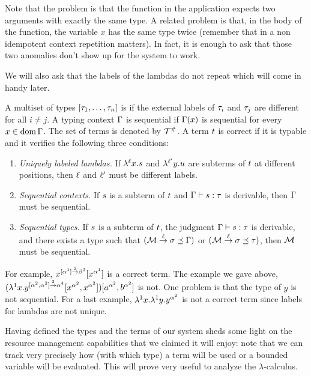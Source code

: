Note that the problem is that the function in the application expects two arguments
with exactly the same type. A related problem is that, in the body of the function,
the variable $x$ has the same type twice (remember that in a non idempotent context repetition matters).
In fact, it is enough to ask that those two anomalies don't show up for the system to work.

We will also ask that the labels of the lambdas do not repeat which
will come in handy later.

\begin{definition}
A multiset of types $[\tau_1,\hdots,\tau_n]$ is 
if the external labels of $\tau_i$ and $\tau_j$ are different for all $i \neq j$.
A typing context $\Gamma$ is sequential if $\Gamma(x)$ is sequential for every $x \in \operatorname{dom}\Gamma$.
The set of  terms is denoted by $\mathcal{T}^{\mathtt{\#}}$.
A term $t$ is correct if it is typable and it verifies the following three conditions:
\begin{enumerate}
\item {\em Uniquely labeled lambdas.}
  If $\lambda^{\ell} x. s$ and $\lambda^{\ell'} y. u$ 
  are subterms of $t$ at different positions, then $\ell$ and $\ell'$
  must be different labels.
\item {\em Sequential contexts.}
  If $s$ is a subterm of $t$ and $\Gamma \vdash s : \tau$
  is derivable, then $\Gamma$ must be sequential.
\item {\em Sequential types.}
  If $s$ is a subterm of $t$,
  the judgment $\Gamma \vdash s : \tau$ is derivable,
  and there exists a type such that
  $(\mathcal{M} \overset{\ell}{\to} \sigma \preceq \Gamma)$ or $(\mathcal{M} \overset{\ell}{\to} \sigma \preceq \tau)$,
  then $\mathcal{M}$ must be sequential.
\end{enumerate}
\end{definition}

For example,
$x^{[\alpha^1] \overset{2}{\to} \beta^3}[x^{\alpha^1}]$ is a correct term.
The example we gave above,
$(\lambda^{1} x. y^{[\alpha^2, \alpha^2] \overset{3}{\to} \alpha^4} [x^{\alpha^2}, x^{\alpha^2}])
[a^{\alpha^2}, b^{\alpha^2}]$ is not.
One problem is that the type of $y$ is not sequential.
For a last example,
$\lambda^{1} x. \lambda^{1} y. y^{\alpha^2}$
is not a correct term since labels for lambdas are not unique.

Having defined the types and the terms of our system
sheds some light on the resource management capabilities that we claimed it will enjoy:
note that we can track very precisely how (\ie with which type) a term will be used or
a bounded variable will be evaluated.
This will prove very useful to analyze the $\lambda$-calculus.

